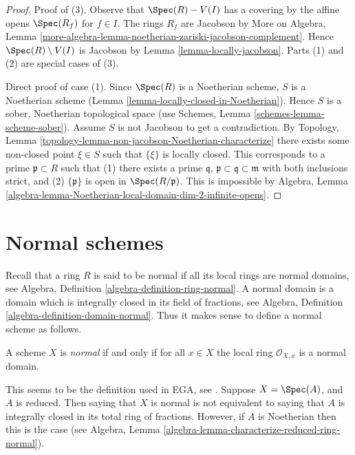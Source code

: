 \begin{proof}
Proof of (3). Observe that $\Spec(R) - V(I)$ has a covering by the affine
opens $\Spec(R_f)$ for $f \in I$. The rings $R_f$ are Jacobson by
More on Algebra, Lemma
\ref{more-algebra-lemma-noetherian-zariski-jacobson-complement}.
Hence $\Spec(R) \setminus V(I)$ is Jacobson by
Lemma \ref{lemma-locally-jacobson}.
Parts (1) and (2) are special cases of (3).

\medskip\noindent
Direct proof of case (1).
Since $\Spec(R)$ is a Noetherian scheme,
$S$ is a Noetherian scheme (Lemma \ref{lemma-locally-closed-in-Noetherian}).
Hence $S$ is a sober, Noetherian topological space (use
Schemes, Lemma \ref{schemes-lemma-scheme-sober}).
Assume $S$ is not Jacobson to
get a contradiction. By
Topology, Lemma \ref{topology-lemma-non-jacobson-Noetherian-characterize}
there exists some non-closed point $\xi \in S$
such that $\{\xi\}$ is locally closed. This corresponds
to a prime $\mathfrak p \subset R$ such that (1) there exists
a prime $\mathfrak q$, $\mathfrak p \subset \mathfrak q \subset \mathfrak m$
with both inclusions strict, and (2) $\{\mathfrak p\}$ is open in
$\Spec(R/\mathfrak p)$. This is impossible by Algebra,
Lemma \ref{algebra-lemma-Noetherian-local-domain-dim-2-infinite-opens}.
\end{proof}







\section{Normal schemes}
\label{section-normal}

\noindent
Recall that a ring $R$ is said to be normal if all its local rings
are normal domains,
see Algebra, Definition \ref{algebra-definition-ring-normal}.
A normal domain is a domain which is integrally closed in its field
of fractions, see
Algebra, Definition \ref{algebra-definition-domain-normal}.
Thus it makes sense to define a normal scheme as follows.

\begin{definition}
\label{definition-normal}
A scheme $X$ is {\it normal} if and only if for all $x \in X$ the local ring
$\mathcal{O}_{X, x}$ is a normal domain.
\end{definition}

\noindent
This seems to be the definition used in EGA, see \cite[0, 4.1.4]{EGA}.
Suppose $X = \Spec(A)$, and $A$ is reduced. Then saying that $X$ is
normal is not equivalent to saying that $A$ is integrally closed in its
total ring of fractions. However, if $A$ is Noetherian then this is the case
(see Algebra, Lemma \ref{algebra-lemma-characterize-reduced-ring-normal}).

